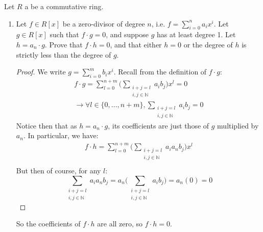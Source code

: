 \documentclass[12pt]{article}
\newenvironment{ex}[2][Exercise]{\begin{trivlist}
\item[\hskip \labelsep {\bfseries #1}\hskip \labelsep {\bfseries #2.}]}{\end{trivlist}}
\begin{document}
\begin{ex}{4}
    Let $R$ a be a commutative ring.
    \begin{enumerate}[label=(\alph*)]
        \item Let $f \in R[x]$ be a zero-divisor of degree $n$, i.e. $f = \sum_{i = 0}^n a_ix^i$. Let $g \in R[x]$ such that $f \cdot g = 0$, and suppose $g$ has at least degree 1. Let $h = a_n \cdot g$. Prove that $f \cdot h = 0$, and that either $h = 0$ or the degree of $h$ is strictly less than the degree of $g$.
        \begin{proof}
            We write $g = \sum_{i = 0}^m b_ix^i$. Recall from the definition of $f \cdot g$:
            \begin{equation}
                \begin{aligned}
                    f \cdot g = \sum_{l = 0}^{n + m} \Big (\sum_{\substack{i + j = l \\ i, j \in \mathbb{N}}} a_ib_j \Big)x^l = 0 \\
                    \rightarrow \forall l \in \{0, ..., n+m\}, \sum_{\substack{i + j = l \\ i, j \in \mathbb{N}}} a_ib_j = 0
                \end{aligned}
            \end{equation}
            Notice then that as $h = a_n \cdot g$, its coefficients are just those of $g$ multiplied by $a_n$. In particular, we have:
            \begin{equation}
                \begin{aligned}
                    f \cdot h = \sum_{l = 0}^{n + m} \Big (\sum_{\substack{i + j = l \\ i, j \in \mathbb{N}}} a_ia_nb_j \Big)x^l\\
                \end{aligned}
            \end{equation}
            But then of course, for any $l$:
            \begin{equation}
                \sum_{\substack{i + j = l \\ i, j \in \mathbb{N}}} a_ia_nb_j = a_n \Big ( \sum_{\substack{i + j = l \\ i, j \in \mathbb{N}}} a_ib_j \Big ) = a_n(0) = 0
            \end{equation}
        \end{proof}
        So the coefficients of $f \cdot h$ are all zero, so $f \cdot h = 0$. \\ \\

\end{enumerate}
\end{ex}
\end{document}
